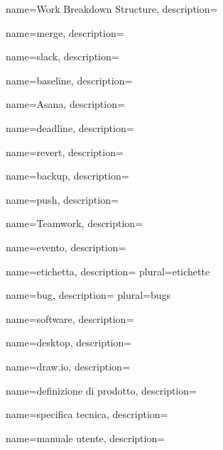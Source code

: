  {
	name=Work Breakdown Structure,
	description={\TODO{}}
}

 {
	name=merge,
	description={\TODO{}}
}

 {
	name=slack,
	description={\TODO{}}
}

 {
	name=baseline,
	description={\TODO{}}
}

 {
	name=Asana,
	description={\TODO{}}
}

 {
	name=deadline,
	description={\TODO{}}
}

 {
	name=revert,
	description={\TODO{}}
}

 {
	name=backup,
	description={\TODO{}}
}

 {
	name=push,
	description={\TODO{}}
}

 {
	name=Teamwork,
	description={\TODO{}}
}

 {
	name=evento,
	description={\TODO{}}
}

 {
	name=etichetta,
	description={\TODO{}}
	plural=etichette
}

 {
	name=bug,
	description={\TODO{}}
	plural=bugs
}

 {
	name=software,
	description={\TODO{}}
}

 {
	name=desktop,
	description={\TODO{}}
}

 {
	name=draw.io,
	description={\TODO{}}
}

 {
	name=definizione di prodotto,
	description={\TODO{}}
}

 {
	name=specifica tecnica,
	description={\TODO{}}
}

 {
	name=manuale utente,
	description={\TODO{}}
}
